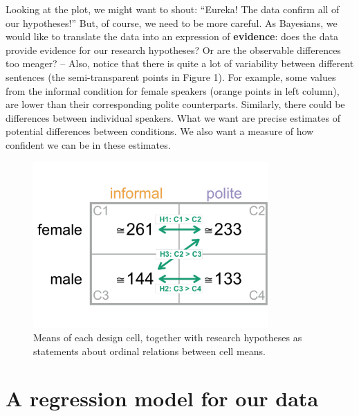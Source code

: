 \documentclass[nobib]{tufte-handout}
\begin{document}
Looking at the plot, we might want to shout: ``Eureka! The data confirm all of our
hypotheses!'' But, of course, we need to be more careful. As Bayesians, we would like to
translate the data into an expression of \textbf{evidence}: does the data provide evidence for
our research hypotheses? Or are the observable differences too meager? -- Also, notice that
there is quite a lot of variability between different sentences (the semi-transparent points in Figure 1).
For example, some values from the informal condition for female speakers (orange points in left
column), are lower than their corresponding polite counterparts. Similarly, there could be differences between individual speakers. What we want are precise
estimates of potential differences between conditions. We also want a measure of how confident we can be in these estimates.

\begin{figure}[h]
  \centering
    \includegraphics[width = 0.8\textwidth]{pics/table_mean_hypotheses.pdf}
    \caption{Means of each design cell, together with research hypotheses as statements about ordinal relations between cell means.}
    \label{fig:BasicPlotData_table}
\end{figure}

\section{A regression model for our data}
\end{document}
